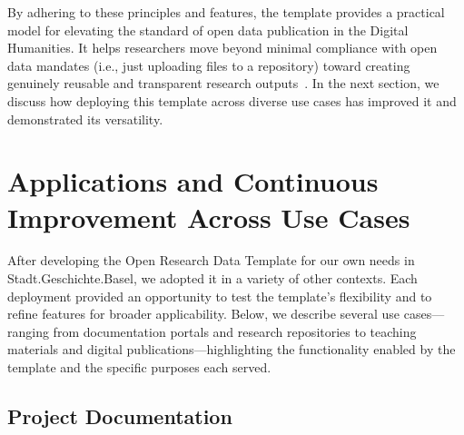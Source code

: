 \documentclass[final]{anthology-ch} %
\begin{document}
\noindent\newline
By adhering to these principles and features, the template provides a practical model for elevating the standard of open data publication in the Digital Humanities. It helps researchers move beyond minimal compliance with open data mandates (i.e., just uploading files to a repository) toward creating genuinely reusable and transparent research outputs~\cite{diekjobst2024a}. In the next section, we discuss how deploying this template across diverse use cases has improved it and demonstrated its versatility.

\section{Applications and Continuous Improvement Across Use Cases}\label{applications-and-continuous-improvement-across-use-cases}

After developing the Open Research Data Template for our own needs in Stadt.Geschichte.Basel, we adopted it in a variety of other contexts. Each deployment provided an opportunity to test the template's flexibility and to refine features for broader applicability. Below, we describe several use cases---ranging from documentation portals and research repositories to teaching materials and digital publications---highlighting the functionality enabled by the template and the specific purposes each served.

\subsection{Project Documentation}\label{project-documentation}
\end{document}

